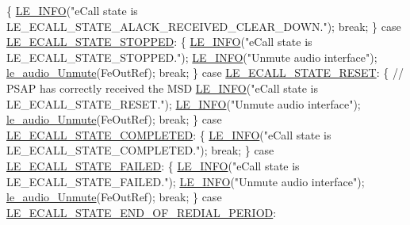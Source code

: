 \begin{DoxyCodeInclude}
{{{{{        \{
            \hyperlink{le__log_8h_a23e6d206faa64f612045d688cdde5808}{LE\_INFO}(\textcolor{stringliteral}{"eCall state is LE\_ECALL\_STATE\_ALACK\_RECEIVED\_CLEAR\_DOWN."});
            \textcolor{keywordflow}{break};
        \}
        \textcolor{keywordflow}{case} \hyperlink{le__ecall__interface_8h_a233609e4724e549a1405f9177c0a07dda28740cfb795561c243501bff53343175}{LE\_ECALL\_STATE\_STOPPED}:
        \{
            \hyperlink{le__log_8h_a23e6d206faa64f612045d688cdde5808}{LE\_INFO}(\textcolor{stringliteral}{"eCall state is LE\_ECALL\_STATE\_STOPPED."});
            \hyperlink{le__log_8h_a23e6d206faa64f612045d688cdde5808}{LE\_INFO}(\textcolor{stringliteral}{"Unmute audio interface"});
            \hyperlink{le__audio__interface_8h_adad24547293481964039efe56bc14e2b}{le\_audio\_Unmute}(FeOutRef);
            \textcolor{keywordflow}{break};
        \}
        \textcolor{keywordflow}{case} \hyperlink{le__ecall__interface_8h_a233609e4724e549a1405f9177c0a07dda71a12603e5a05716c7579e12f6f85734}{LE\_ECALL\_STATE\_RESET}:
        \{
            \textcolor{comment}{// PSAP has correctly received the MSD}
            \hyperlink{le__log_8h_a23e6d206faa64f612045d688cdde5808}{LE\_INFO}(\textcolor{stringliteral}{"eCall state is LE\_ECALL\_STATE\_RESET."});
            \hyperlink{le__log_8h_a23e6d206faa64f612045d688cdde5808}{LE\_INFO}(\textcolor{stringliteral}{"Unmute audio interface"});
            \hyperlink{le__audio__interface_8h_adad24547293481964039efe56bc14e2b}{le\_audio\_Unmute}(FeOutRef);
            \textcolor{keywordflow}{break};
        \}
        \textcolor{keywordflow}{case} \hyperlink{le__ecall__interface_8h_a233609e4724e549a1405f9177c0a07dda40cb68755482f2068f414e4bd1d2bf13}{LE\_ECALL\_STATE\_COMPLETED}:
        \{
            \hyperlink{le__log_8h_a23e6d206faa64f612045d688cdde5808}{LE\_INFO}(\textcolor{stringliteral}{"eCall state is LE\_ECALL\_STATE\_COMPLETED."});
            \textcolor{keywordflow}{break};
        \}
        \textcolor{keywordflow}{case} \hyperlink{le__ecall__interface_8h_a233609e4724e549a1405f9177c0a07dda5275385371c51e441a9eb97626c271b4}{LE\_ECALL\_STATE\_FAILED}:
        \{
            \hyperlink{le__log_8h_a23e6d206faa64f612045d688cdde5808}{LE\_INFO}(\textcolor{stringliteral}{"eCall state is LE\_ECALL\_STATE\_FAILED."});
            \hyperlink{le__log_8h_a23e6d206faa64f612045d688cdde5808}{LE\_INFO}(\textcolor{stringliteral}{"Unmute audio interface"});
            \hyperlink{le__audio__interface_8h_adad24547293481964039efe56bc14e2b}{le\_audio\_Unmute}(FeOutRef);
            \textcolor{keywordflow}{break};
        \}
        \textcolor{keywordflow}{case} \hyperlink{le__ecall__interface_8h_a233609e4724e549a1405f9177c0a07ddac5c297a2a70f2490f4f65d72b3a74481}{LE\_ECALL\_STATE\_END\_OF\_REDIAL\_PERIOD}:
}}}}}
\end{DoxyCodeInclude}
